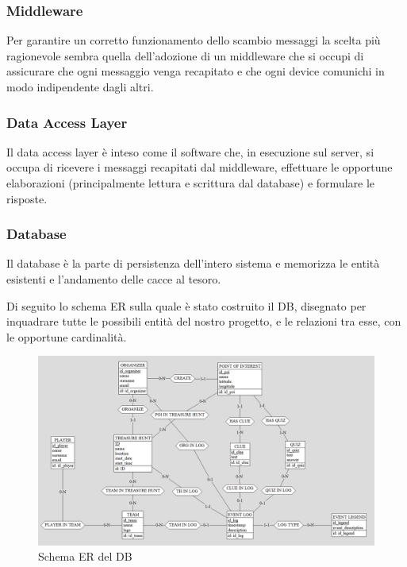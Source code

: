 \documentclass[12pt, italian]{article}
\begin{document}
\subsubsection{Middleware}
Per garantire un corretto funzionamento dello scambio messaggi la scelta più ragionevole sembra quella dell'adozione di un middleware che si occupi di assicurare che ogni messaggio venga recapitato e che ogni device comunichi in modo indipendente dagli altri.
\subsubsection{Data Access Layer}
Il data access layer è inteso come il software che, in esecuzione sul server, si occupa di ricevere i messaggi recapitati dal middleware, effettuare le opportune elaborazioni (principalmente lettura e scrittura dal database) e formulare le risposte.
\subsubsection{Database}
Il database è la parte di persistenza dell'intero sistema e memorizza le entità esistenti e l'andamento delle cacce al tesoro.

Di seguito lo schema ER sulla quale è stato costruito il DB, disegnato per inquadrare tutte le possibili entità del nostro progetto, e le relazioni tra esse, con le opportune cardinalità. 

\begin{figure}[H]
	\centering
	\includegraphics[width=1\textwidth]{img/ER.png}
	\caption{Schema ER del DB}
\end{figure}

\newpage
\end{document}
